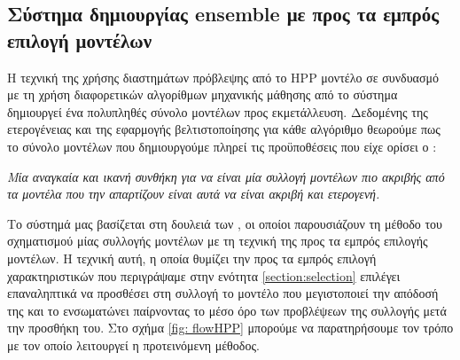 \subsection{Σύστημα δημιουργίας ensemble με προς τα εμπρός επιλογή μοντέλων} Η τεχνική της χρήσης διαστημάτων πρόβλεψης από το HPP μοντέλο σε συνδυασμό με τη χρήση διαφορετικών αλγορίθμων μηχανικής μάθησης από το σύστημα δημιουργεί ένα πολυπληθές σύνολο μοντέλων προς εκμετάλλευση. Δεδομένης της ετερογένειας και της εφαρμογής βελτιστοποίησης για κάθε αλγόριθμο θεωρούμε πως το σύνολο μοντέλων που δημιουργούμε πληρεί τις προϋποθέσεις που είχε ορίσει ο \citet{Dietterich2000}:  

\begin{displayquote}
	\textit{Μία αναγκαία και ικανή συνθήκη για να είναι μία συλλογή μοντέλων πιο ακριβής από τα μοντέλα που την απαρτίζουν είναι αυτά να είναι ακριβή και ετερογενή.}
\end{displayquote}

Το σύστημά μας βασίζεται στη δουλειά των \citet{Caruana:2004:ESL:1015330.1015432}, οι οποίοι παρουσιάζουν τη μέθοδο του σχηματισμού μίας συλλογής μοντέλων με τη τεχνική της προς τα εμπρός επιλογής μοντέλων. Η τεχνική αυτή, η οποία θυμίζει την προς τα εμπρός επιλογή χαρακτηριστικών που περιγράψαμε στην ενότητα \ref{section:selection} επιλέγει επαναληπτικά να προσθέσει στη συλλογή το μοντέλο που μεγιστοποιεί την απόδοσή της και το ενσωματώνει παίρνοντας το μέσο όρο των προβλέψεων της συλλογής μετά την προσθήκη του. Στο σχήμα \ref{fig: flowHPP} μπορούμε να παρατηρήσουμε τον τρόπο με τον οποίο λειτουργεί η προτεινόμενη μέθοδος.

